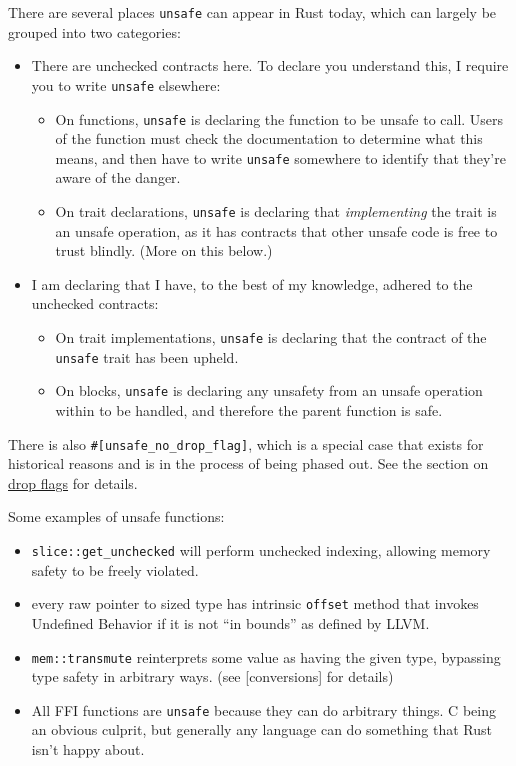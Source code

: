 \documentclass[a4paper,]{book}
\providecommand{\tightlist}{%
  \setlength{\itemsep}{0pt}\setlength{\parskip}{0pt}}
\begin{document}
There are several places \texttt{unsafe} can appear in Rust today, which
can largely be grouped into two categories:

\begin{itemize}
\tightlist
\item
  There are unchecked contracts here. To declare you understand this, I
  require you to write \texttt{unsafe} elsewhere:

  \begin{itemize}
  \tightlist
  \item
    On functions, \texttt{unsafe} is declaring the function to be unsafe
    to call. Users of the function must check the documentation to
    determine what this means, and then have to write \texttt{unsafe}
    somewhere to identify that they're aware of the danger.
  \item
    On trait declarations, \texttt{unsafe} is declaring that
    \emph{implementing} the trait is an unsafe operation, as it has
    contracts that other unsafe code is free to trust blindly. (More on
    this below.)
  \end{itemize}
\item
  I am declaring that I have, to the best of my knowledge, adhered to
  the unchecked contracts:

  \begin{itemize}
  \tightlist
  \item
    On trait implementations, \texttt{unsafe} is declaring that the
    contract of the \texttt{unsafe} trait has been upheld.
  \item
    On blocks, \texttt{unsafe} is declaring any unsafety from an unsafe
    operation within to be handled, and therefore the parent function is
    safe.
  \end{itemize}
\end{itemize}

There is also \texttt{\#{[}unsafe\_no\_drop\_flag{]}}, which is a
special case that exists for historical reasons and is in the process of
being phased out. See the section on
\protect\hyperlink{sec--drop-flags}{drop flags} for details.

Some examples of unsafe functions:

\begin{itemize}
\tightlist
\item
  \texttt{slice::get\_unchecked} will perform unchecked indexing,
  allowing memory safety to be freely violated.
\item
  every raw pointer to sized type has intrinsic \texttt{offset} method
  that invokes Undefined Behavior if it is not ``in bounds'' as defined
  by LLVM.
\item
  \texttt{mem::transmute} reinterprets some value as having the given
  type, bypassing type safety in arbitrary ways. (see {[}conversions{]}
  for details)
\item
  All FFI functions are \texttt{unsafe} because they can do arbitrary
  things. C being an obvious culprit, but generally any language can do
  something that Rust isn't happy about.
\end{itemize}
\end{document}
